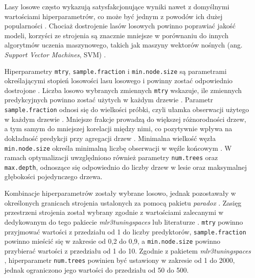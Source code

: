 \documentclass{amuthesis}
\begin{document}
Lasy losowe często wykazują satysfakcjonujące wyniki nawet z domyślnymi
wartościami hiperparametrów, co może być jednym z powodów ich dużej
popularności \autocite{lovelace_2019_geocomputation}. Chociaż
dostrojenie lasów losowych powinno poprawiać jakość modeli, korzyści ze
strojenia są znacznie mniejsze w porównaniu do innych algorytmów uczenia
maszynowego, takich jak maszyny wektorów nośnych (ang. \emph{Support
Vector Machines}, SVM) \autocite{probst_2019_hyperparameters}.

Hiperparametry \texttt{mtry}, \texttt{sample.fraction} i
\texttt{min.node.size} są parametrami określającymi stopień losowości
lasu losowego i powinny zostać odpowiednio dostrojone
\autocite{probst_2019_hyperparameters}. Liczba losowo wybranych
zmiennych \texttt{mtry} wskazuje, ile zmiennych predykcyjnych powinno
zostać użytych w każdym drzewie \autocite{lovelace_2019_geocomputation}.
Parametr \texttt{sample.fraction} odnosi się do wielkości próbki, czyli
ułamka obserwacji użytego w każdym drzewie
\autocite{lovelace_2019_geocomputation}. Mniejsze frakcje prowadzą do
większej różnorodności drzew, a tym samym do mniejszej korelacji między
nimi, co pozytywnie wpływa na dokładność predykcji przy agregacji drzew
\autocite{probst_2019_hyperparameters}. Minimalna wielkość węzła
\texttt{min.node.size} określa minimalną liczbę obserwacji w węźle
końcowym \autocite{probst_2019_hyperparameters}. W ramach optymalizacji
uwzględniono również parametry \texttt{num.trees} oraz
\texttt{max.depth}, odnoszące się odpowiednio do liczby drzew w lesie
oraz maksymalnej głębokości pojedynczego drzewa.

Kombinacje hiperparametrów zostały wybrane losowo, jednak pozostawały w
określonych granicach strojenia ustalonych za pomocą pakietu
\emph{paradox} \autocite{R-paradox}. Zasięg przestrzeni strojenia został
wybrany zgodnie z wartościami zalecanymi w dedykowanym do tego pakiecie
\emph{mlr3tuningspaces} \autocite{R-mlr3tuningspaces} lub literaturze
\autocite{probst_2019_hyperparameters,schratz_2019_hyperparameters}.
\texttt{mtry} powinno przyjmować wartości z przedziału od 1 do liczby
predyktorów, \texttt{sample.fraction} powinno mieścić się w zakresie od
0,2 do 0,9, a \texttt{min.node.size} powinno przybierać wartości z
przedziału od 1 do 10. Zgodnie z pakietem \emph{mlr3tuningspaces}
\autocite{R-mlr3tuningspaces}, hiperparametr \texttt{num.trees} powinien
być ustawiony w zakresie od 1 do 2000, jednak ograniczono jego wartości
do przedziału od 50 do 500.
\end{document}
